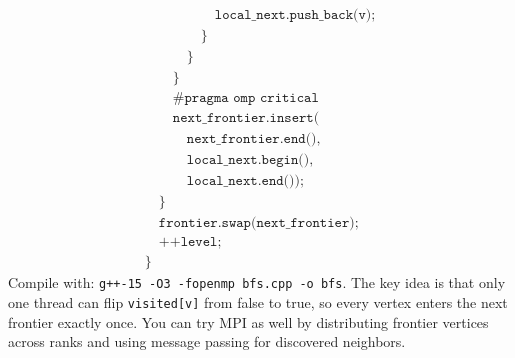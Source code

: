 \begin{ppexercises}
\begin{ppexercise}
{\[
\begin{array}{l}
\quad\quad\quad\quad\quad \texttt{local\_next.push\_back(v);} \\
\quad\quad\quad\quad \texttt{\}} \\
\quad\quad\quad \texttt{\}} \\
\quad\quad \texttt{\}} \\
\quad\quad \texttt{\#pragma omp critical} \\
\quad\quad \texttt{next\_frontier.insert(} \\
\quad\quad\quad \texttt{next\_frontier.end(),} \\
\quad\quad\quad \texttt{local\_next.begin(),} \\
\quad\quad\quad \texttt{local\_next.end());} \\
\quad \texttt{\}} \\
\quad \texttt{frontier.swap(next\_frontier);} \\
\quad \texttt{++level;} \\
\texttt{\}}
\end{array}
\]
Compile with: \texttt{g++-15 -O3 -fopenmp bfs.cpp -o bfs}.
The key idea is that only one thread can flip \texttt{visited[v]} from false to true, so every vertex enters the next frontier exactly once. You can try MPI as well by distributing frontier vertices across ranks and using message passing for discovered neighbors.
}
\end{ppexercise}
\end{ppexercises}
